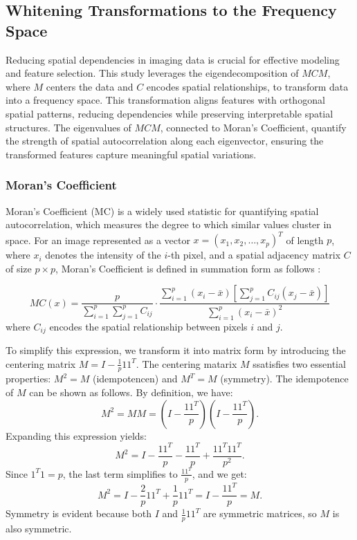 \documentclass[12pt]{article}
\begin{document}
\subsection{Whitening Transformations to the Frequency Space}

Reducing spatial dependencies in imaging data is crucial for effective modeling and feature selection. This study leverages the eigendecomposition of \( MCM \), where \( M \) centers the data and \( C \) encodes spatial relationships, to transform data into a frequency space. This transformation aligns features with orthogonal spatial patterns, reducing dependencies while preserving interpretable spatial structures. The eigenvalues of \( MCM \), connected to Moran’s Coefficient, quantify the strength of spatial autocorrelation along each eigenvector, ensuring the transformed features capture meaningful spatial variations.

\subsubsection{Moran’s Coefficient}

Moran’s Coefficient (MC) is a widely used statistic for quantifying spatial autocorrelation, which measures the degree to which similar values cluster in space. For an image represented as a vector \( x = (x_1, x_2, \dots, x_p)^T \) of length \( p \), where \( x_i \) denotes the intensity of the \( i \)-th pixel, and a spatial adjacency matrix \( C \) of size \( p \times p \), Moran’s Coefficient is defined in summation form as follows \citet{griffith2014spatial}:

\[
  M C(x) = \frac{p}{\sum_{i=1}^p \sum_{j=1}^p C_{ij}} \cdot \frac{\sum_{i=1}^p \left(x_i - \bar{x} \right) \left[ \sum_{j=1}^p C_{ij} \left( x_j - \bar{x} \right) \right]}{\sum_{i=1}^p \left( x_i - \bar{x} \right)^2}
\]
where \( C_{ij} \) encodes the spatial relationship between pixels \( i \) and \( j \). 

To simplify this expression, we transform it into matrix form by introducing the centering matrix \( M = I - \frac{1}{p} 1 1^T \). The centering matarix \( M \) ssatisfies two essential properties: \( M^2 = M \) (idempotencen) and \( M^T = M \) (symmetry). The idempotence of \( M \) can be shown as follows. By definition, we have:
\[
  M^2 = M M = \left( I - \frac{1 1^T}{p} \right) \left( I - \frac{1 1^T}{p} \right).
\]
Expanding this expression yields:
\[
  M^2 = I - \frac{1 1^T}{p} - \frac{1 1^T}{p} + \frac{1 1^T 1 1^T}{p^2}.
\]
Since \( 1^T 1 = p \), the last term simplifies to \( \frac{1 1^T}{p} \), and we get:
\[
  M^2 = I - \frac{2}{p} 1 1^T + \frac{1}{p} 1 1^T = I - \frac{1 1^T}{p} = M.
\]
Symmetry is evident because both \( I \) and \( \frac{1}{p} 1 1^T \) are symmetric matrices, so \( M \) is also symmetric.
\end{document}
